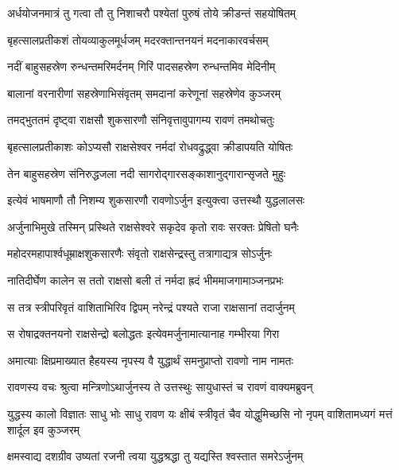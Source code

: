 \twolineshloka
{अर्धयोजनमात्रं तु गत्वा तौ तु निशाचरौ}
{पश्येतां पुरुषं तोये क्रीडन्तं सहयोषितम्} %

\twolineshloka
{बृहत्सालप्रतीकशं तोयव्याकुलमूर्धजम्}
{मदरक्तान्तनयनं मदनाकारवर्चसम्} %

\twolineshloka
{नदीं बाहुसहस्रेण रुन्धन्तमरिमर्दनम्}
{गिरिं पादसहस्रेण रुन्धन्तमिव मेदिनीम्} %

\twolineshloka
{बालानां वरनारीणां सहस्रेणाभिसंवृतम्}
{समदानां करेणूनां सहस्रेणेव कुञ्जरम्} %

\twolineshloka
{तमद्भुततमं दृष्ट्वा राक्षसौ शुकसारणौ}
{संनिवृत्तावुपागम्य रावणं तमथोचतुः} %

\twolineshloka
{बृहत्सालप्रतीकाशः कोऽप्यसौ राक्षसेश्वर}
{नर्मदां रोधवद्रुद्ध्वा क्रीडापयति योषितः} %

\twolineshloka
{तेन बाहुसहस्रेण संनिरुद्धजला नदी}
{सागरोद्गारसङ्काशानुद्गारान्सृजते मुहुः} %

\twolineshloka
{इत्येवं भाषमाणौ तौ निशम्य शुकसारणौ}
{रावणोऽर्जुन इत्युक्त्वा उत्तस्थौ युद्धलालसः} %

\twolineshloka
{अर्जुनाभिमुखे तस्मिन् प्रस्थिते राक्षसेश्वरे}
{सकृदेव कृतो रावः सरक्तः प्रेषितो घनैः} %

\twolineshloka
{महोदरमहापार्श्वधूम्राक्षशुकसारणैः}
{संवृतो राक्षसेन्द्रस्तु तत्रागाद्यत्र सोऽर्जुनः} %

\twolineshloka
{नातिदीर्घेण कालेन स ततो राक्षसो बली}
{तं नर्मदा ह्रदं भीममाजगामाञ्जनप्रभः} %

\twolineshloka
{स तत्र स्त्रीपरिवृतं वाशिताभिरिव द्विपम्}
{नरेन्द्रं पश्यते राजा राक्षसानां तदार्जुनम्} %

\twolineshloka
{स रोषाद्रक्तनयनो राक्षसेन्द्रो बलोद्धतः}
{इत्येवमर्जुनामात्यानाह गम्भीरया गिरा} %

\twolineshloka
{अमात्याः क्षिप्रमाख्यात हैहयस्य नृपस्य वै}
{युद्धार्थं समनुप्राप्तो रावणो नाम नामतः} %

\twolineshloka
{रावणस्य वचः श्रुत्वा मन्त्रिणोऽथार्जुनस्य ते}
{उत्तस्थुः सायुधास्तं च रावणं वाक्यमब्रुवन्} %

\threelineshloka
{युद्धस्य कालो विज्ञातः साधु भोः साधु रावण}
{यः क्षीबं स्त्रीवृतं चैव योद्धुमिच्छसि नो नृपम्}
{वाशितामध्यगं मत्तं शार्दूल इव कुञ्जरम्} %

\twolineshloka
{क्षमस्वाद्य दशग्रीव उष्यतां रजनी त्वया}
{युद्धश्रद्धा तु यद्यस्ति श्वस्तात समरेऽर्जुनम्} %

